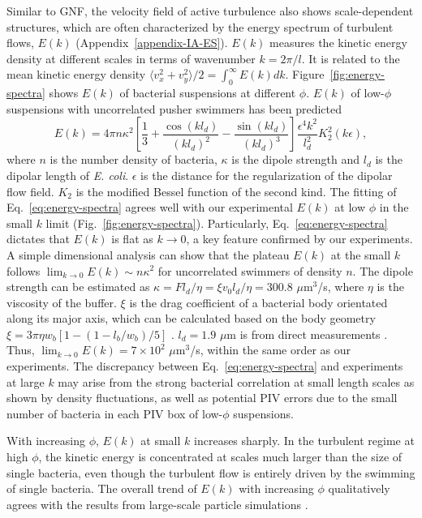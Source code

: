 \documentclass[twocolumn,aps,prx,amsmath,amssymb,longbibliography]{revtex4-2}
\begin{document}
Similar to GNF, the velocity field of active turbulence also shows scale-dependent structures, which are often characterized by the energy spectrum of turbulent flows, $E(k)$ (Appendix~\ref{appendix-IA-ES}). $E(k)$ measures the kinetic energy density at different scales in terms of wavenumber $k = 2\pi/l$. It is related to the mean kinetic energy density $\langle v_x^2 + v_y^2 \rangle/2 = \int_0^\infty E(k)dk$. Figure~\ref{fig:energy-spectra} shows $E(k)$ of bacterial suspensions at different $\phi$. $E(k)$ of low-$\phi$ suspensions with uncorrelated pusher swimmers has been predicted \cite{Bardfalvy2019}
\begin{equation}
\label{eq:energy-spectra}
E(k) = 4\pi n \kappa^2 \left[ \frac{1}{3} + \frac{\cos(kl_d)}{(kl_d)^2} - \frac{\sin(kl_d)}{(kl_d)^3} \right] \frac{\epsilon^4k^2}{l_d^2} K_2^2(k\epsilon),
\end{equation}
where $n$ is the number density of bacteria, $\kappa$ is the dipole strength and $l_d$ is the dipolar length of \textit{E. coli}. $\epsilon$ is the distance for the regularization of the dipolar flow field. $K_2$ is the modified Bessel function of the second kind.
The fitting of Eq.~\ref{eq:energy-spectra} agrees well with our experimental $E(k)$ at low $\phi$ in the small $k$ limit (Fig.~\ref{fig:energy-spectra}). Particularly, Eq.~\ref{eq:energy-spectra} dictates that $E(k)$ is flat as $k \to 0$, a key feature confirmed by our experiments. A simple dimensional analysis can show that the plateau $E(k)$ at the small $k$ follows $\lim_{k \to 0}E(k) \sim n \kappa^2$ for uncorrelated swimmers of density $n$. The dipole strength can be estimated as $\kappa = Fl_d/\eta = \xi v_0 l_d/\eta = 300.8$ $\mu$m$^3$/s, where $\eta$ is the viscosity of the buffer. $\xi$ is the drag coefficient of a bacterial body orientated along its major axis, which can be calculated based on the body geometry $\xi = 3\pi\eta w_b \left[1-(1-l_b/w_b)/5\right]$ \cite{Magariyama2002}. $l_d = 1.9$ $\mu$m is from direct measurements \cite{Drescher2011}. Thus, $\lim_{k \to 0}E(k) = 7 \times 10^2$ $\mu$m$^3$/s, within the same order as our experiments. The discrepancy between Eq.~\ref{eq:energy-spectra} and experiments at large $k$ may arise from the strong bacterial correlation at small length scales as shown by density fluctuations, as well as potential PIV errors due to the small number of bacteria in each PIV box of low-$\phi$ suspensions.

With increasing $\phi$, $E(k)$ at small $k$ increases sharply. In the turbulent regime at high $\phi$, the kinetic energy is concentrated at scales much larger than the size of single bacteria, even though the turbulent flow is entirely driven by the swimming of single bacteria. The overall trend of $E(k)$ with increasing $\phi$ qualitatively agrees with the results from large-scale particle simulations \cite{Saintillan2012,Bardfalvy2019}.
\end{document}
